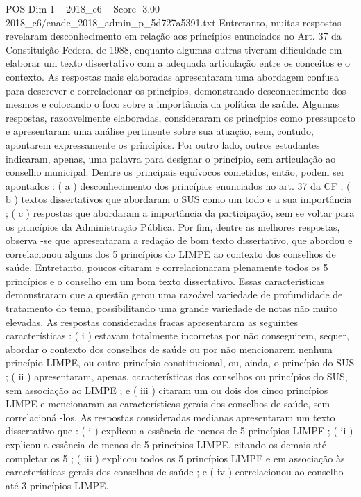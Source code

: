 \begin{textsample}{POS Dim 1 – 2018\_c6 – Score -3.00 – 2018\_c6/enade\_2018\_admin\_p\_5d727a5391.txt}
Entretanto, muitas respostas revelaram desconhecimento em relação aos princípios enunciados no Art. 37 da Constituição Federal de 1988, enquanto algumas outras tiveram dificuldade em elaborar um texto dissertativo com a adequada articulação entre os conceitos e o contexto.
As respostas mais elaboradas apresentaram uma abordagem confusa para descrever e correlacionar os princípios, demonstrando desconhecimento dos mesmos e colocando o foco sobre a importância da política de saúde.
Algumas respostas, razoavelmente elaboradas, consideraram os princípios como pressuposto e apresentaram uma análise pertinente sobre sua atuação, sem, contudo, apontarem expressamente os princípios.
Por outro lado, outros estudantes indicaram, apenas, uma palavra para designar o princípio, sem articulação ao conselho municipal.
Dentre os principais equívocos cometidos, então, podem ser apontados : ( a ) desconhecimento dos princípios enunciados no art. 37 da CF ; ( b ) textos dissertativos que abordaram o SUS como um todo e a sua importância ; ( c ) respostas que abordaram a importância da participação, sem se voltar para os princípios da Administração Pública.
Por fim, dentre as melhores respostas, observa -se que apresentaram a redação de bom texto dissertativo, que abordou e correlacionou alguns dos 5 princípios do LIMPE ao contexto dos conselhos de saúde.
Entretanto, poucos citaram e correlacionaram plenamente todos os 5 princípios e o conselho em um bom texto dissertativo.
Essas características demonstraram que a questão gerou uma razoável variedade de profundidade de tratamento do tema, possibilitando uma grande variedade de notas não muito elevadas.
As respostas consideradas fracas apresentaram as seguintes características : ( i ) estavam totalmente incorretas por não conseguirem, sequer, abordar o contexto dos conselhos de saúde ou por não mencionarem nenhum princípio LIMPE, ou outro princípio constitucional, ou, ainda, o princípio do SUS ; ( ii ) apresentaram, apenas, características dos conselhos ou princípios do SUS, sem associação ao LIMPE ; e ( iii ) citaram um ou dois dos cinco princípios LIMPE e mencionaram as características gerais dos conselhos de saúde, sem correlacioná -los.
As respostas consideradas medianas apresentaram um texto dissertativo que : ( i ) explicou a essência de menos de 5 princípios LIMPE ; ( ii ) explicou a essência de menos de 5 princípios LIMPE, citando os demais até completar os 5 ; ( iii ) explicou todos os 5 princípios LIMPE e em associação às características gerais dos conselhos de saúde ; e ( iv ) correlacionou ao conselho até 3 princípios LIMPE.

\end{textsample}
